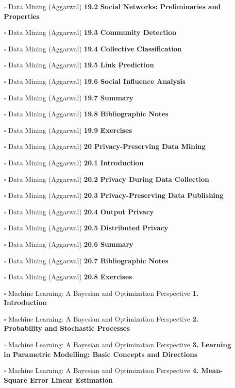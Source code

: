 \documentclass[a4, landscape, 12pt]{article}
\newcommand{\checkbox}{$\square$}%
\begin{document}
\begin{itemize}
{}
\item [\checkbox]  Data Mining (Aggarwal) \textbf{ 19.2 Social Networks: Preliminaries and Properties
}
\item [\checkbox]  Data Mining (Aggarwal) \textbf{ 19.3 Community Detection
}
\item [\checkbox]  Data Mining (Aggarwal) \textbf{ 19.4 Collective Classification
}
\item [\checkbox]  Data Mining (Aggarwal) \textbf{ 19.5 Link Prediction
}
\item [\checkbox]  Data Mining (Aggarwal) \textbf{ 19.6 Social Influence Analysis
}
\item [\checkbox]  Data Mining (Aggarwal) \textbf{ 19.7 Summary
}
\item [\checkbox]  Data Mining (Aggarwal) \textbf{ 19.8 Bibliographic Notes
}
\item [\checkbox]  Data Mining (Aggarwal) \textbf{ 19.9 Exercises
}
\item [\checkbox]  Data Mining (Aggarwal) \textbf{ 20 Privacy-Preserving Data Mining
}
\item [\checkbox]  Data Mining (Aggarwal) \textbf{ 20.1 Introduction
}
\item [\checkbox]  Data Mining (Aggarwal) \textbf{ 20.2 Privacy During Data Collection
}
\item [\checkbox]  Data Mining (Aggarwal) \textbf{ 20.3 Privacy-Preserving Data Publishing
}
\item [\checkbox]  Data Mining (Aggarwal) \textbf{ 20.4 Output Privacy
}
\item [\checkbox]  Data Mining (Aggarwal) \textbf{ 20.5 Distributed Privacy
}
\item [\checkbox]  Data Mining (Aggarwal) \textbf{ 20.6 Summary
}
\item [\checkbox]  Data Mining (Aggarwal) \textbf{ 20.7 Bibliographic Notes
}
\item [\checkbox]  Data Mining (Aggarwal) \textbf{ 20.8 Exercises
}
\item [\checkbox]  Machine Learning: A Bayesian and Optimization Perspective \textbf{ 1. Introduction
}
\item [\checkbox]  Machine Learning: A Bayesian and Optimization Perspective \textbf{ 2. Probability and Stochastic Processes
}
\item [\checkbox]  Machine Learning: A Bayesian and Optimization Perspective \textbf{ 3. Learning in Parametric 
Modelling: Basic Concepts and Directions
}
\item [\checkbox]  Machine Learning: A Bayesian and Optimization Perspective \textbf{ 4. Mean-Square Error Linear Estimation
}
\end{itemize}
\end{document}

